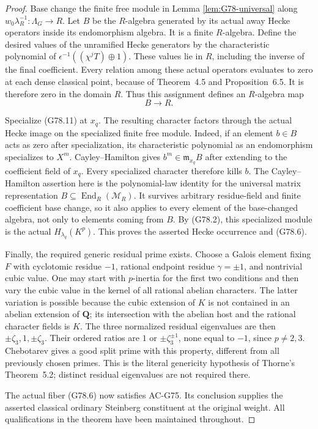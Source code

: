 \begin{proof}
Base change the finite free module in Lemma
\ref{lem:G78-universal} along
\(w_0\lambda_R^{-1}:\Lambda_G\to R\).
Let \(B\) be the \(R\)-algebra generated by its actual
away Hecke operators inside its endomorphism algebra.
It is a finite \(R\)-algebra.
Define the desired values of the unramified Hecke
generators by the characteristic polynomial of
\(\epsilon^{-1}((\chi^j T)\oplus1)\).
These values lie in \(R\), including the inverse of
the final coefficient.
Every relation among these actual operators evaluates
to zero at each dense classical point, because of
Theorem~4.5 and Proposition~6.5.
It is therefore zero in the domain \(R\).
Thus this assignment defines an \(R\)-algebra map
\[
                               B\longrightarrow R.    \tag{G78.11}
\]

Specialize (G78.11) at \(x_q\).
The resulting character factors through the actual
Hecke image on the specialized finite free module.
Indeed, if an element \(b\in B\) acts as zero after
specialization, its characteristic polynomial as an
endomorphism specializes to \(X^m\).
Cayley--Hamilton gives \(b^m\in\mathfrak m_{x_q}B\)
after extending to the coefficient field of \(x_q\).
Every specialized character therefore kills \(b\).
The Cayley--Hamilton assertion here is the polynomial-law
identity for the universal matrix representation
\(B\subseteq\operatorname{End}_R(\mathscr M_R)\).
It survives arbitrary residue-field and finite coefficient
base change, so it also applies to every element of the
base-changed algebra, not only to elements coming from \(B\).
By (G78.2), this specialized module is the actual
\(H_{\lambda_q}(K^p)\).
This proves the asserted Hecke occurrence and (G78.6).

Finally, the required generic residual prime exists.
Choose a Galois element fixing \(F\) with cyclotomic
residue \(-1\), rational endpoint residue \(\gamma=\pm1\),
and nontrivial cubic value.
One may start with \(p\)-inertia for the first two
conditions and then vary the cubic value in the kernel
of all rational abelian characters.
The latter variation is possible because the cubic
extension of \(K\) is not contained in an abelian
extension of \(\mathbf Q\); its intersection with the
abelian host and the rational character fields is \(K\).
The three normalized residual eigenvalues are then
\(\pm\zeta_3,1,\pm\zeta_3\).
Their ordered ratios are \(1\) or \(\pm\zeta_3^{\pm1}\),
none equal to \(-1\), since \(p\ne2,3\).
Chebotarev gives a good split prime with this property,
different from all previously chosen primes.
This is the literal genericity hypothesis of
Thorne's Theorem~5.2; distinct residual eigenvalues
are not required there.

The actual fiber (G78.6) now satisfies AC-G75.
Its conclusion supplies the asserted classical
ordinary Steinberg constituent at the original
weight.  All qualifications in the theorem have
been maintained throughout.
\end{proof}


